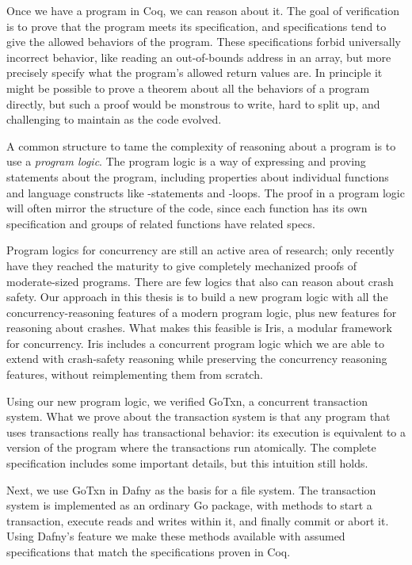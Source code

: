 Once we have a program in Coq, we can reason about it. The goal of
verification is to prove that the program meets its specification, and
specifications tend to give the allowed behaviors of the program. These
specifications forbid universally incorrect behavior, like reading an
out-of-bounds address in an array, but more precisely specify what the program's
allowed return values are. In principle it might be possible to prove a theorem
about all the behaviors of a program directly, but such a proof would be
monstrous to write, hard to split up, and challenging to maintain as the code
evolved.

A common structure to tame the complexity of reasoning about a program is to use
a \emph{program logic}. The program logic is a way of expressing and proving
statements about the program, including properties about individual functions
and language constructs like -statements and -loops. The proof
in a program logic will often mirror the structure of the code, since each
function has its own specification and groups of related functions have related
specs.

Program logics for concurrency are still an active area of research; only
recently have they reached the maturity to give completely mechanized proofs of
moderate-sized programs. There are few logics that also can reason about crash
safety. Our approach in this thesis is to build a new program logic with all the
concurrency-reasoning features of a modern program logic, plus new features for
reasoning about crashes. What makes this feasible is Iris, a modular framework
for concurrency. Iris includes a concurrent program logic which we are able to
extend with crash-safety reasoning while preserving the concurrency reasoning
features, without reimplementing them from scratch.

Using our new program logic, we verified GoTxn, a concurrent transaction system.
What we prove about the transaction system is that any program that uses
transactions really has transactional behavior: its execution is equivalent to a
version of the program where the transactions run atomically. The complete
specification includes some important details, but this intuition still holds.

Next, we use GoTxn in Dafny as the basis for a file system.
The transaction system is implemented as an ordinary Go package, with methods to
start a transaction, execute reads and writes within it, and finally commit or
abort it. Using Dafny's  feature we make these methods available with
assumed specifications that match the specifications proven in Coq.

